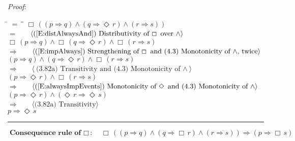 \documentclass[12pt, fleqn, leqno]{article}
\newcommand{\lgap}{2pt}                             %
\newcommand{\mymathindent}{24pt}                    %
\newcommand{\impl}{\ensuremath{\Rightarrow}}        %
\newcommand{\Event}{\Diamond\,}
\newcommand{\Always}{\Box\,}
\newcommand{\myqed}{\rule[-.23ex]{1.2ex}{2.0ex}}
\newcommand{\myqedtab}{\hspace{384pt}}              %
\newcommand{\Gll} {\langle}                         %
\newcommand{\Ggg} {\rangle}                         %
\newcommand{\Hint}[1]     {\ \ \ $\Gll              \mbox{#1} \Ggg$ }   %
\begin{document}
\emph{Proof}:
\begin{tabbing}
\hspace{\mymathindent} \= $= \;$ \= \myqedtab \= \kill
  \> \>   $\Always ( (p \impl q) \land (q \impl \Event r) \land (r \impl s))$\\[\lgap]
   \> $=$  \>  \Hint{(\ref{E:distAlwaysAnd}) Distributivity of $\Always$ over $\land$}\\[\lgap]
  \> \>   $\Always ( p \impl q) \land \Always (q \impl \Event r) \land \Always (r \impl s)$\\[\lgap]
   \> $\impl$  \>  \Hint{(\ref{E:impAlways}) Strengthening of $\Always$ and (4.3) Monotonicity of $\land$, twice}\\[\lgap]
    \> \>   $ (p \impl q) \land (q \impl \Event r) \land \Always (r \impl s)$\\[\lgap]
    \> $\impl$  \>  \Hint{(3.82a) Transitivity and (4.3) Monotonicity of $\land$}\\[\lgap]
     \> \>   $ (p \impl \Event r) \land \Always (r \impl s)$\\[\lgap]
     \> $\impl$ \> \Hint{(\ref{E:alwaysImpEvents}) Monotonicity of $\Event$ and (4.3) Monotonicity of $\land$} \\[\lgap]
  \> \>   $ (p \impl \Event r) \land (\Event r \impl \Event s)$\\[\lgap]
  \> $\impl$  \>  \Hint{(3.82a) Transitivity}\\[\lgap]
  \> \>   $ p \impl \Event s$\quad \myqed
\end{tabbing}
\begin{equation}\label{E:AlwaysConRule}
\textbf{Consequence rule of $\Always$:}\quad \Always ( (p \impl q) \land (q \impl \Always r) \land (r \impl s)) \impl (p \impl \Always s)
\end{equation}
\end{document}
